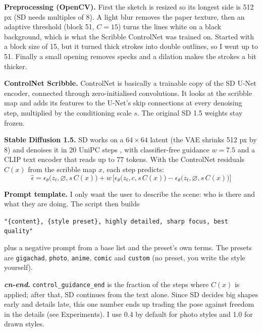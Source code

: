 \documentclass[11pt,a4paper]{article}
\newcommand{\cnend}{\textit{cn-end}}
\begin{document}
\textbf{Preprocessing (OpenCV).} First the sketch is resized so its longest side is 512 px (SD needs
multiples of 8). A light blur removes the paper texture, then an adaptive threshold (block 51, $C = 15$) turns
the lines white on a black background, which is what the Scribble ControlNet was trained on. Started with a
block size of 15, but it turned thick strokes into double outlines, so I went up to 51. Finally a small opening
removes specks and a dilation makes the strokes a bit thicker.

\textbf{ControlNet Scribble.} ControlNet is basically a trainable copy of the SD U-Net encoder, connected
through zero-initialised convolutions. It looks at the scribble map and adds its features to the U-Net's skip
connections at every denoising step, multiplied by the conditioning scale $s$. The original SD 1.5 weights
stay frozen.

\textbf{Stable Diffusion 1.5.} SD works on a $64\times64$ latent (the VAE shrinks 512 px by 8) and denoises it
in 20 UniPC steps \cite{zhao2023}, with classifier-free guidance \cite{ho2022} $w = 7.5$ and a CLIP text encoder
\cite{radford2021} that reads up to 77 tokens. With the ControlNet residuals $C(x)$ from the scribble map $x$,
each step predicts:
\begin{equation}
  \hat\epsilon = \epsilon_\theta\big(z_t, \varnothing, s\,C(x)\big)
     + w\,\Big[\epsilon_\theta\big(z_t, c, s\,C(x)\big) - \epsilon_\theta\big(z_t, \varnothing, s\,C(x)\big)\Big]
\end{equation}

\textbf{Prompt template.} I only want the user to describe the scene: who is there and what they are doing.
The script then builds
\begin{center}
  \small\texttt{"\{content\}, \{style preset\}, highly detailed, sharp focus, best quality"}
\end{center}
plus a negative prompt from a base list and the preset's own terms. The presets are \texttt{gigachad},
\texttt{photo}, \texttt{anime}, \texttt{comic} and \texttt{custom} (no preset, you write the style yourself).

\textbf{\cnend.} \texttt{control\_guidance\_end} is the fraction of the steps where $C(x)$ is applied; after
that, SD continues from the text alone. Since SD decides big shapes early and details late, this one number
ends up trading the pose against freedom in the details (see Experiments). I use 0.4 by default for photo
styles and 1.0 for drawn styles.

\end{document}
